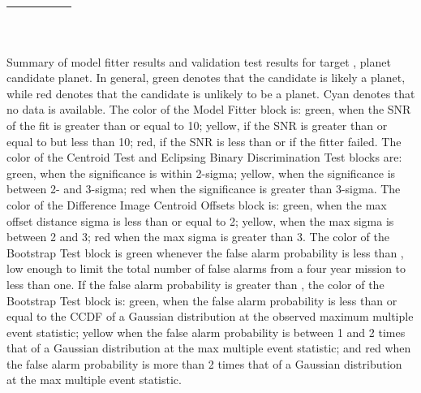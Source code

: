 {\begin{table}[htb!]
\begin{tabularx}{\tablewidth}{| m{\blockTitleWidth} | >{\hsize=0.5\hsize}X | >{\hsize=0.5\hsize}X | X | m{\blockTitleWidth} |}
{          } \\
          \hline
        \end{tabularx}\\
        \vspace{.25cm}

        Summary of model fitter results and validation test results
        for target \keplerId, planet candidate \csname
        planet\thislevelitem \endcsname.
        In general, green denotes that the candidate is likely a
        planet, while red denotes that the candidate is unlikely to be
        a planet. Cyan denotes that no data is available.
        The color of the Model Fitter block is: green, when the SNR of
        the fit is greater than or equal to 10; yellow, if the SNR is
        greater than or equal to {\searchTransitThreshold} but less than
        10; red, if the SNR is less than {\searchTransitThreshold} or
        if the fitter failed.
        The color of the Centroid Test and Eclipsing Binary
        Discrimination Test blocks are: green, when the significance
        is within 2-sigma; yellow, when the significance is between 2-
        and 3-sigma; red when the significance is greater than
        3-sigma.
        The color of the Difference Image Centroid Offsets block is:
        green, when the max offset distance sigma is less than or equal
        to 2; yellow, when the max sigma is between 2 and 3; red when
        the max sigma is greater than 3.
        The color of the Bootstrap Test block is green whenever the
        false alarm probability is less than , low enough to
        limit the total number of false alarms from a four year mission
        to less than one. If the false alarm probability is greater
        than , the color of the Bootstrap Test block is: green,
        when the false alarm probability is less than or equal to the
        CCDF of a Gaussian distribution at the observed maximum multiple
        event statistic; yellow when the false alarm probability is
        between 1 and 2 times that of a Gaussian distribution at the max
        multiple event statistic; and red when the false alarm
        probability is more than 2 times that of a Gaussian distribution
        at the max multiple event statistic.
      \end{table}
      \clearpage
    }
    {\planets}
